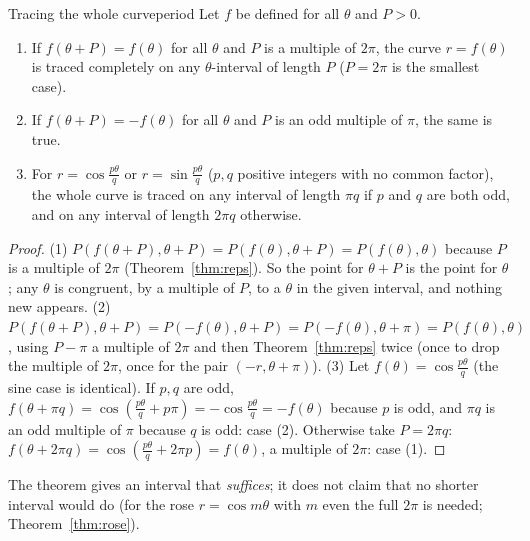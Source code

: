 \documentclass[11pt]{article}
\begin{document}
\begin{thm}{Tracing the whole curve}{period}
Let $f$ be defined for all $\theta$ and $P>0$.
\begin{enumerate}[nosep]
  \item If $f(\theta+P)=f(\theta)$ for all $\theta$ and $P$ is a multiple of $2\pi$, the curve $r=f(\theta)$ is traced completely on any $\theta$-interval of length $P$ ($P=2\pi$ is the smallest case).
  \item If $f(\theta+P)=-f(\theta)$ for all $\theta$ and $P$ is an odd multiple of $\pi$, the same is true.
  \item For $r=\cos\frac{p\theta}q$ or $r=\sin\frac{p\theta}q$ ($p,q$ positive integers with no common factor), the whole curve is traced on any interval of length $\pi q$ if $p$ and $q$ are both odd, and on any interval of length $2\pi q$ otherwise.
\end{enumerate}
\end{thm}
\begin{proof}
(1) $P(f(\theta+P),\theta+P)=P(f(\theta),\theta+P)=P(f(\theta),\theta)$ because $P$ is a multiple of $2\pi$ (Theorem~\ref{thm:reps}). So the point for $\theta+P$ is the point for $\theta$; any $\theta$ is congruent, by a multiple of $P$, to a $\theta$ in the given interval, and nothing new appears.
(2) $P(f(\theta+P),\theta+P)=P(-f(\theta),\theta+P)=P(-f(\theta),\theta+\pi)=P(f(\theta),\theta)$, using $P-\pi$ a multiple of $2\pi$ and then Theorem~\ref{thm:reps} twice (once to drop the multiple of $2\pi$, once for the pair $(-r,\theta+\pi)$).
(3) Let $f(\theta)=\cos\frac{p\theta}q$ (the sine case is identical). If $p,q$ are odd, $f(\theta+\pi q)=\cos\left(\frac{p\theta}q+p\pi\right)=-\cos\frac{p\theta}q=-f(\theta)$ because $p$ is odd, and $\pi q$ is an odd multiple of $\pi$ because $q$ is odd: case (2). Otherwise take $P=2\pi q$: $f(\theta+2\pi q)=\cos\left(\frac{p\theta}q+2\pi p\right)=f(\theta)$, a multiple of $2\pi$: case (1).
\end{proof}

The theorem gives an interval that \emph{suffices}; it does not claim that no shorter interval would do (for the rose $r=\cos m\theta$ with $m$ even the full $2\pi$ is needed; Theorem~\ref{thm:rose}).
\end{document}
